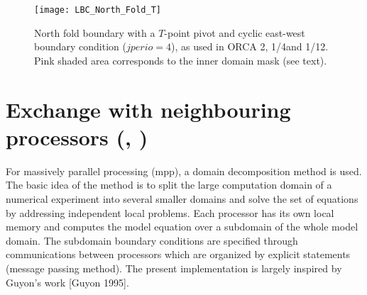 \documentclass[../main/NEMO_manual]{subfiles}
\begin{document}
\begin{figure}[!t]
  \centering
  \texttt{[image: LBC\_North\_Fold\_T]}
  \caption[North fold boundary in ORCA 2\deg, 1/4\deg and 1/12\deg]{
    North fold boundary with a $T$-point pivot and cyclic east-west boundary condition ($jperio=4$),
    as used in ORCA 2\deg, 1/4\deg and 1/12\deg.
    Pink shaded area corresponds to the inner domain mask (see text).}
  \label{fig:LBC_North_Fold_T}
\end{figure}

\section[Exchange with neighbouring processors (\textit{lbclnk.F90}, \textit{lib\_mpp.F90})]{Exchange with neighbouring processors (\protect{}, \protect{})}
\label{sec:LBC_mpp}

\begin{listing}
  \caption{}
  \label{lst:nammpp}
\end{listing}

For massively parallel processing (mpp), a domain decomposition method is used.
The basic idea of the method is to split the large computation domain of a numerical experiment into several smaller domains and
solve the set of equations by addressing independent local problems.
Each processor has its own local memory and computes the model equation over a subdomain of the whole model domain.
The subdomain boundary conditions are specified through communications between processors which are organized by
explicit statements (message passing method).
The present implementation is largely inspired by Guyon's work [Guyon 1995].
\end{document}
